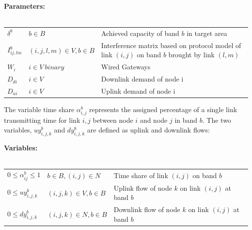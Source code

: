 \noindent
{\bf Parameters:}\\
\\
\begin{tabular}{llp{3.4cm}}
$\delta^b$ & $b \in B$ & Achieved capacity of band $b$ in target area\\
$I_{ij,lm}^b$ & $(i,j,l,m) \in V, b\in B $ & Interference matrix based on protocol model of link $(i,j)$ on band $b$ brought by link $(l,m)$\\
$W_i$ & $i \in V\ binary$ & Wired Gateways\\
$D_{di}$ & $i \in V\ $ & Downlink demand of node i\\
$D_{ui}$ & $i \in V\ $ & Uplink demand of node i\\
\end{tabular}

The variable time share $\alpha_{i,j}^b$ represents the assigned percentage of a single link transmitting time  
for link $i,j$ between node $i$ and node $j$ in band $b$. 
The two variables, $uy_{i,j,k}^{b}$ and $dy_{i,j,k}^{b}$ are defined as uplink and downlink flows:

\noindent
{\bf Variables:}\\
\\
\begin{tabular}{llp{3cm}}
$0\le \alpha_{ij}^b \le 1$  & $b\in B, (i,j) \in N$ & 
Time share of link $(i,j)$ on band $b$\\ 
$0\le uy_{i,j,k}^b$ & $(i,j,k) \in V, b \in B$ & 
Uplink flow of node $k$ on link $(i,j)$ at band $b$ \\ 
$0\le dy_{i,j,k}^b$ & $(i,j,k) \in N, b \in B$ & 
Downlink flow of node $k$ on link $(i,j)$ at band $b$ \\ 
\end{tabular}
\vspace{1pt}

